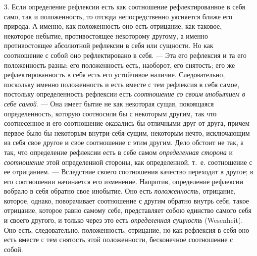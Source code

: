 3. Если определение рефлексии есть как соотношение рефлектированное в себя
само, так и положенность, то отсюда непосредственно уясняется ближе его
природа. А именно, как положенность оно есть отрицание, как таковое,
некоторое небытие, противостоящее некоторому другому, а именно
противостоящее абсолютной рефлексии в себя или сущности. Но как соотношение
с собой оно рефлектировано в себя. --- Эта его рефлексия и та его положенность
разны; его положенность есть, наоборот, его снятость; его же
рефлектированность в себя есть его устойчивое наличие. Следовательно,
поскольку именно положенность и есть вместе с тем рефлексия в себя самое,
постольку определенность рефлексии есть
{\em соотношение со своим инобытием в себе самой}. ---
Она имеет бытие не как некоторая сущая, покоящаяся определенность, которую
соотносили бы с некоторым другим, так что соотнесенное и его соотношение
оказались бы отличными друг от друга, причем первое было бы некоторым
внутри-себя-сущим, некоторым нечто, исключающим из себя свое другое и свое
соотношение с этим другим. Дело обстоит не так, а так, что определение
рефлексии есть в себе самом {\em определенная сторона}
и {\em соотношение} этой определенной стороны, как
определенной, т.~е. соотношение с ее отрицанием. --- Вследствие своего
соотношения качество переходит в другое; в его соотношении начинается его
изменение. Напротив, определение рефлексии вобрало в себя обратно свое
инобытие. Оно есть {\em положенность}, отрицание,
которое, однако, поворачивает соотношение с другим обратно внутрь себя,
такое отрицание, которое равно самому себе, представляет собою единство
самого себя и своего другого, и только через это есть
{\em определенная сущность} (Wesenheit). Оно есть,
следовательно, положенность, отрицание, но как рефлексия в себя оно есть
вместе с тем снятость этой положенности, бесконечное соотношение с собой.


